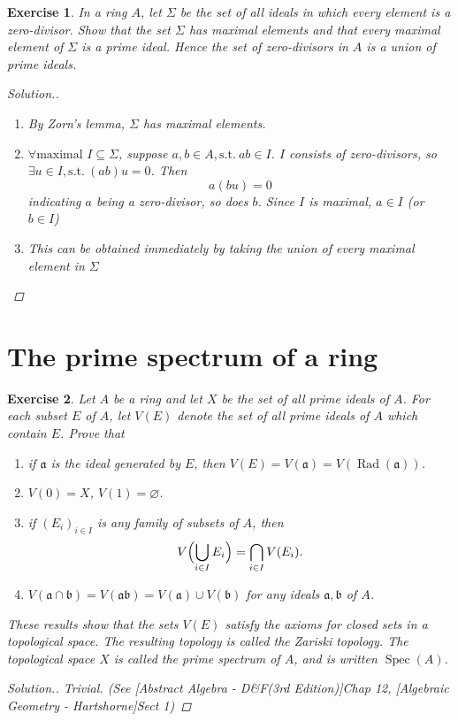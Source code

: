 \documentclass{article}
\theoremstyle{breakstyle}
\newtheorem{exercise}{Exercise}
\newenvironment{solution}
  {\begin{proof}[Solution.]\renewcommand{\qedsymbol}{}}
  {\end{proof}}
\DeclareMathOperator{\rad}{Rad}
\DeclareMathOperator{\spec}{Spec}
\begin{document}
\begin{exercise}
In a ring \(A\), let \(\Sigma\) be the set of all ideals in which every element is a zero-divisor. Show that the set \(\Sigma\) has maximal elements and that every maximal element of \(\Sigma\) is a prime ideal. Hence the set of zero-divisors in \(A\) is a union of prime ideals.

\begin{solution}
    \begin{enumerate}[label=({\roman*})]
            \item By Zorn's lemma, $\Sigma$ has maximal elements.
            \item $\forall\text{maximal } I\subseteq \Sigma$, suppose $a,b\in A,\mathrm{s.t.}\ ab\in I$.
                $I$ consists of zero-divisors, so $\exists u\in I,\mathrm{s.t.}\ (ab)u=0$.
                Then
                $$
                a(bu)=0
                $$
                indicating $a$ being a zero-divisor, so does $b$.
                Since $I$ is maximal, $a\in I$ (or $b\in I$) 
            \item This can be obtained immediately by taking the union of every maximal element in $\Sigma$
        \end{enumerate}
\end{solution}
\end{exercise}

\section*{The prime spectrum of a ring}

\begin{exercise}
Let \(A\) be a ring and let \(X\) be the set of all prime ideals of \(A\). For each subset \(E\) of \(A\), let \(V(E)\) denote the set of all prime ideals of \(A\) which contain \(E\). Prove that
\begin{enumerate}[label=(\roman*)]
    \item if \(\mathfrak a\) is the ideal generated by \(E\), then \(V(E)=V(\mathfrak a)=V(\rad(\mathfrak a))\).
    \item \(V(0)=X\), \(V(1)=\varnothing\).
    \item if \((E_i)_{i\in I}\) is any family of subsets of \(A\), then
    \[
    V\Bigl(\bigcup_{i\in I}E_i\Bigr)=\bigcap_{i\in I}V(E_i).
    \]
    \item \(V(\mathfrak a\cap\mathfrak b)=V(\mathfrak{ab})=V(\mathfrak a)\cup V(\mathfrak b)\) for any ideals \(\mathfrak a,\mathfrak b\) of \(A\).
\end{enumerate}
These results show that the sets \(V(E)\) satisfy the axioms for closed sets in a topological space. The resulting topology is called the Zariski topology. The topological space \(X\) is called the prime spectrum of \(A\), and is written \(\spec(A)\).

\begin{solution}
    Trivial. \emph{(See [Abstract Algebra - D\&F(3rd Edition)]Chap 12, [Algebraic Geometry - Hartshorne]Sect 1)}
\end{solution}
\end{exercise}
\end{document}
